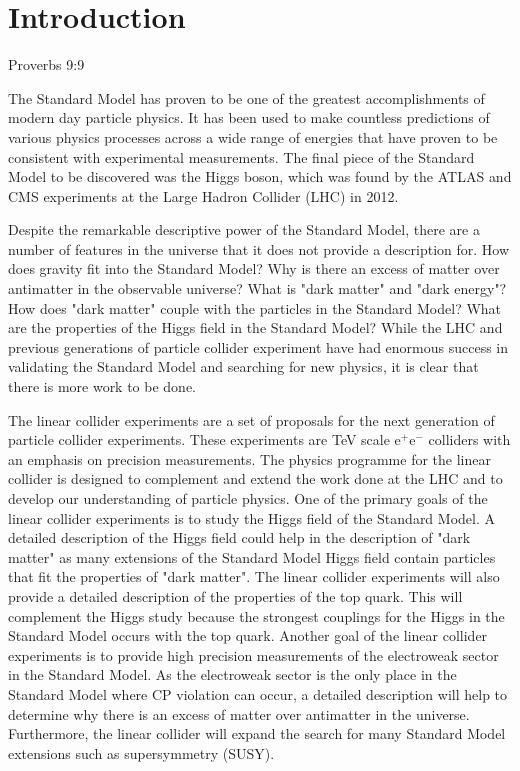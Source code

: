 \chapter{Introduction}
\label{chap:introduction}

{Proverbs 9:9}


The Standard Model has proven to be one of the greatest accomplishments of modern day particle physics.  It has been used to make countless predictions of various physics processes across a wide range of energies {that} have proven to be consistent with experimental measurements.  The final piece of the Standard Model to be discovered was the Higgs boson, which was found by the ATLAS \cite{Aad:2012tfa} and CMS \cite{Chatrchyan:2012xdj} experiments at the Large Hadron Collider (LHC) in 2012.  

Despite the remarkable descriptive power of the Standard Model, there are a number of features in the universe that it does not provide a description for.  How does gravity fit into the Standard Model?  Why is there an excess of matter over antimatter in the observable universe?  What is "dark matter" and "dark energy"?  How does "dark matter" couple with the particles in the Standard Model?  What are the properties of the Higgs field in the Standard Model?  While the LHC and previous generations of particle collider experiment have had enormous success in validating the Standard Model and searching for new physics, it is clear that there is more work to be done. 

The linear collider experiments are a set of proposals for the next generation of particle collider experiments.  These experiments are TeV scale $\text{e}^{+}\text{e}^{-}$ colliders with an emphasis on precision measurements.  The physics programme for the linear collider is designed to complement and extend the work done at the LHC and to develop our understanding of particle physics.  One of the primary goals of the linear collider experiments is to study the Higgs field of the Standard Model.  A detailed description of the Higgs field could help in the description of "dark matter" as many extensions of the Standard Model Higgs field contain particles that fit the properties of "dark matter".  The linear collider experiments will also provide a detailed description of the properties of the top quark.  This will complement the Higgs study because the strongest couplings for the Higgs in the Standard Model occurs with the top quark.  Another goal of the linear collider experiments is to provide high precision measurements of the electroweak sector in the Standard Model.  As the electroweak sector is the only place in the Standard Model where CP violation can occur, a detailed description will help to determine why there is an excess of matter over antimatter in the universe.  Furthermore, the linear collider will expand the {search} for many Standard Model extensions such as supersymmetry (SUSY).

